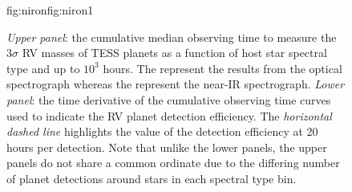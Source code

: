 \begin{figure}
\begin{ocg}{fig:niron}{fig:niron}{1}
  \end{ocg}
  \hspace{-\hsize}%
  \caption[Cumulative mean observing times to measure RV masses of TOI planets versus spectral type.]
      {\small \emph{Upper panel}: the cumulative median observing time to measure the $3\sigma$ RV masses of
    TESS planets as a function of host star spectral type and up to $10^3$ hours. The  
     represent the results from
    the optical spectrograph whereas the
     represent the near-IR
    spectrograph. \emph{Lower panel}: the time derivative of the cumulative observing time curves used to indicate
    the RV planet detection efficiency. The \emph{horizontal dashed line} highlights the value of the detection
    efficiency at 20 hours per detection.   
    Note that unlike the lower panels, the upper panels do not share a common ordinate due to the differing
    number of planet detections around stars in each spectral type bin.}
  \label{RVFCfig:cumulativeTeff}
\end{figure}

